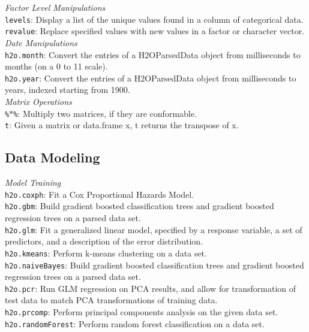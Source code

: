 \documentclass[11pt]{article}
\begin{document}
{{\emph{Factor Level Manipulations}\\
{\texttt{levels}}: Display a list of the unique values found in a column of categorical data. \\
{\texttt{revalue}}: Replace specified values with new values in a factor or character vector.\\

\emph{Date Manipulations}\\
{\texttt{h2o.month}}: Convert the entries of a H2OParsedData object from milliseconds to months (on a 0 to 11 scale). \\
{\texttt{h2o.year}}: Convert the entries of a H2OParsedData object from milliseconds to years, indexed starting from 1900.\\

\emph{Matrix Operations}\\
{\texttt{\%$*$\%}}}: Multiply two matrices, if they are conformable.\\
{\texttt{t}}: Given a matrix or data.frame x, t returns the transpose of x.\\

\subsection{Data Modeling}

\emph{Model Training}\\
{\texttt{h2o.coxph}}: Fit a Cox Proportional Hazards Model. \\
{\texttt{h2o.gbm}}: Build gradient boosted classification trees and gradient boosted regression trees on a parsed data set. \\
{\texttt{h2o.glm}}: Fit a generalized linear model, specified by a response variable, a set of predictors, and a description of the error distribution. \\
{\texttt{h2o.kmeans}}: Perform k-means clustering on a data set. \\
{\texttt{h2o.naiveBayes}}: Build gradient boosted classification trees and gradient boosted regression trees on a parsed data set.\\
{\texttt{h2o.pcr}}: Run GLM regression on PCA results, and allow for transformation of test data to match PCA transformations of training data. \\
{\texttt{h2o.prcomp}}: Perform principal components analysis on the given data set. \\
{\texttt{h2o.randomForest}}: Perform random forest classification on a data set.\\

}
\end{document}
